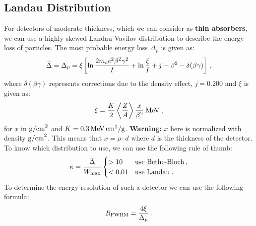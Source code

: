 \documentclass[10pt, titlepage, a4paper]{article}
\newcommand\thickbar[1]{\accentset{\rule{.5em}{.03em}}{#1}}
\renewcommand{\bar}{\thickbar}
\numberwithin{equation}{section}
\begin{document}
\subsection{Landau Distribution}
For detectors of moderate thickness, which we can consider as \textbf{thin absorbers}, we can use a highly-skewed 
Landau-Vavilov distribution to describe the energy loss of particles. The most probable energy loss $\Delta_p$ is given as:
%
\begin{equation}
    \bar{\Delta} = \Delta_p = \xi\left[\ln{\frac{2m_ec^2\beta^2\gamma^2}{I}} + \ln{\frac{\xi}{I} + j - \beta^2 - \delta(\beta\gamma)}\right]\>,
    \label{eq:landau}
\end{equation}
%
where $\delta(\beta\gamma)$ represents corrections due to the density effect, $j=0.200$ and $\xi$ is given as:
%
\begin{equation}
    \xi = \frac{K}{2}\left\langle\frac{Z}{A}\right\rangle\frac{x}{\beta^2}\>\rm{MeV}\>,
    \label{eq:xi}
\end{equation}
%
for $x$ in $\rm{g/cm}^2$ and $K = 0.3\,\rm{MeV}\,\rm{cm}^2\rm{/g}$. \textbf{Warning:} $x$ here is normalized with density $\rm{g/cm}^2$. This
means that $x = \rho\cdot d$ where $d$ is the thickness of the detector. To know which distribution to use, we can use the 
following rule of thumb:
%
\begin{equation}
    \kappa = \frac{\bar{\Delta}}{W_{\rm{max}}} \begin{cases}
        > 10 & \text{use Bethe-Bloch}\>, \\
        < 0.01 & \text{use Landau}\>.
    \end{cases}
\end{equation}
%
To determine the energy resolution of such a detector we can use the following formula:
%
\begin{equation}
    R_{\rm{FWHM}} = \frac{4\xi}{\Delta_p}\>.
    \label{eq:landau-res}
\end{equation}
%
\end{document}
